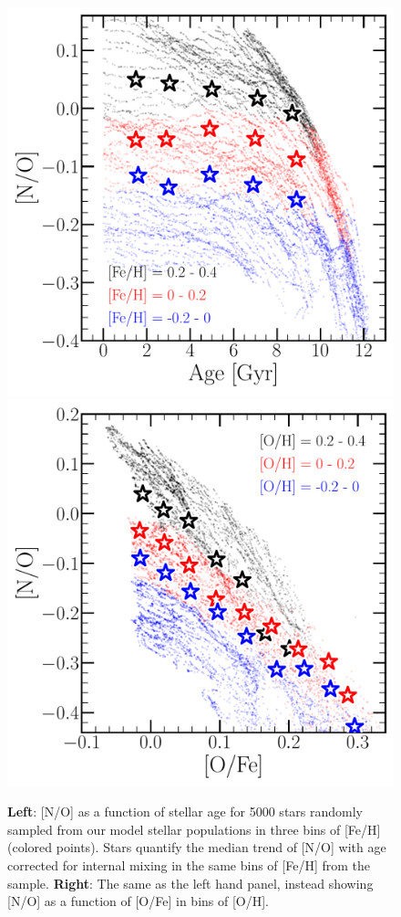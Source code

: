 \documentclass[ms.tex]{subfiles}
\begin{document}
\begin{figure} 
\centering 
\includegraphics[scale = 0.45]{no_vs_age.pdf} 
\includegraphics[scale = 0.45]{no_vs_ofe.pdf} 
\caption{
\textbf{Left}: [N/O] as a function of stellar age for 5000 stars randomly 
sampled from our model stellar populations in three bins of [Fe/H] (colored 
points). 
Stars quantify the median trend of [N/O] with age corrected for internal mixing 
in the same bins of [Fe/H] from the~\citet{Vincenzo2021} sample. 
\textbf{Right}: The same as the left hand panel, instead showing [N/O] as a 
function of [O/Fe] in bins of [O/H]. 
} 
\label{fig:vincenzo_comp} 
\end{figure} 
\end{document}
